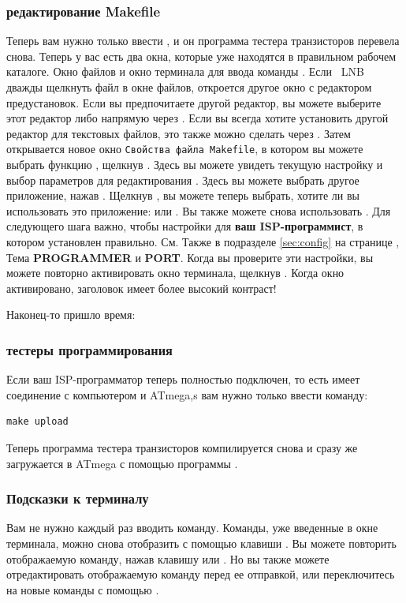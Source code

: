 \subsubsection{редактирование Makefile}
Теперь вам нужно только ввести , и он программа тестера транзисторов перевела снова.
Теперь у вас есть два окна, которые уже находятся в правильном рабочем каталоге.
Окно файлов и окно терминала для ввода команды .
Если \ LNB дважды щелкнуть файл  в окне файлов, откроется другое окно с редактором предустановок.
Если вы предпочитаете другой редактор, вы можете
выберите этот редактор либо напрямую через \RMB {}.
Если вы всегда хотите установить другой редактор для текстовых файлов,
это также можно сделать через \RMB {}.
Затем открывается новое окно \verb"Свойства файла Makefile",
в котором вы можете выбрать функцию , щелкнув \RMB.
Здесь вы можете увидеть текущую настройку и выбор параметров для редактирования .
Здесь вы можете выбрать другое приложение, нажав \LMB.
Щелкнув \LMB, вы можете теперь выбрать, хотите ли вы использовать это
приложение:  или .
Вы также можете снова использовать .
Для следующего шага важно, чтобы настройки для
\textbf{ваш ISP-программист}, в котором  установлен правильно.
См. Также в подразделе \ref{sec:config} на странице \pageref{sec:config-Prog},
Тема \textbf{PROGRAMMER} и \textbf{PORT}.
Когда вы проверите эти настройки,
вы можете повторно активировать окно терминала, щелкнув \LMB.
Когда окно активировано, заголовок имеет более высокий контраст!

Наконец-то пришло время:
\subsubsection{тестеры программирования}
Если ваш ISP-программатор теперь полностью подключен, то есть имеет соединение с компьютером и ATmega,s
вам нужно только ввести команду:
\begin{large} \vspace{-0.4em} \begin{verbatim}
make upload
\end{verbatim} \end{large}
Теперь программа тестера транзисторов компилируется снова и сразу же загружается в ATmega с помощью
программы .
\subsubsection{Подсказки к терминалу} 
Вам не нужно каждый раз вводить команду.
Команды, уже введенные в окне терминала, можно снова отобразить с помощью клавиши \keys{$\uparrow$}.
Вы можете повторить отображаемую команду, нажав клавишу \keys{\enter} или \keys{\return}.
Но вы также можете отредактировать отображаемую команду перед ее отправкой,
или переключитесь на новые команды с помощью \keys{$\downarrow$}.\\



